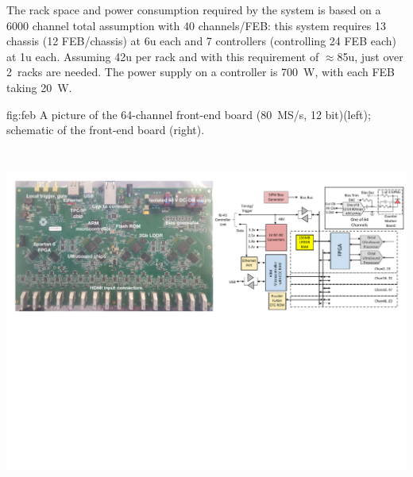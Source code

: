 The rack space and power consumption required by the system is based on a 6000 channel total assumption with 40 channels/FEB: this system requires 13 chassis (12 FEB/chassis) at 6u each and 7 controllers (controlling 24 FEB each) at 1u each. Assuming 42u per rack and with this requirement of $\approx$85u, just over 2~racks are needed. The power supply on a controller is 700~W, with each FEB taking 20~W. 
 

\begin{dunefigure}
 {fig:feb}
 {A picture of the 64-channel  front-end board (80~MS/s, 12 bit)(left); schematic of the front-end board (right).}
\includegraphics[height=4.8in]{graphics/pds-feb-tdr.pdf} 
\vspace{-6.3cm}
\end{dunefigure}



